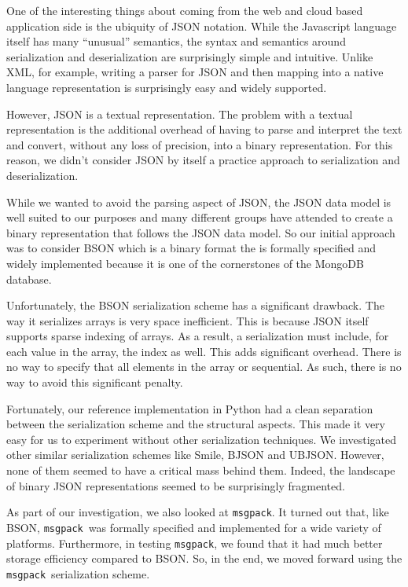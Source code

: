 \documentclass[11pt,a4paper,onecolumn]{article}
\newcommand{\msgpack}{\texttt{msgpack}}
\begin{document}
One of the interesting things about coming from the web and cloud
based application side is the ubiquity of JSON notation.  While the
Javascript language itself has many ``unusual'' semantics, the syntax
and semantics around serialization and deserialization are
surprisingly simple and intuitive.  Unlike XML, for example, writing a
parser for JSON and then mapping into a native language representation
is surprisingly easy and widely supported.

However, JSON is a textual representation.  The problem with a textual
representation is the additional overhead of having to parse and
interpret the text and convert, without any loss of precision, into a
binary representation.  For this reason, we didn't consider JSON by
itself a practice approach to serialization and deserialization.

While we wanted to avoid the parsing aspect of JSON, the JSON data
model \cite{JSON} is well suited to our purposes and many different
groups have attended to create a binary representation that follows
the JSON data model.  So our initial approach was to consider BSON
\cite{BSON} which is a binary format the is formally specified and
widely implemented because it is one of the cornerstones of the
MongoDB database\cite{MongoDB}.

Unfortunately, the BSON serialization scheme has a significant
drawback.  The way it serializes arrays is very space inefficient.
This is because JSON itself supports sparse indexing of arrays.  As a
result, a serialization must include, for each value in the array, the
index as well.  This adds significant overhead.  There is no way to
specify that all elements in the array or sequential.  As such, there
is no way to avoid this significant penalty.

Fortunately, our reference implementation in Python\cite{pyRecon} had
a clean separation between the serialization scheme and the structural
aspects.  This made it very easy for us to experiment without other
serialization techniques.  We investigated other similar serialization
schemes like Smile\cite{Smile}, BJSON\cite{BJSON} and
UBJSON\cite{UBJSON}.  However, none of them seemed to have a critical
mass behind them.  Indeed, the landscape of binary JSON
representations seemed to be surprisingly fragmented.

As part of our investigation, we also looked at \msgpack.  It turned
out that, like BSON, \msgpack\ was formally specified and implemented
for a wide variety of platforms\cite{MsgPack}.  Furthermore, in
testing \msgpack, we found that it had much better storage efficiency
compared to BSON.  So, in the end, we moved forward using the
\msgpack\ serialization scheme.
\end{document}
